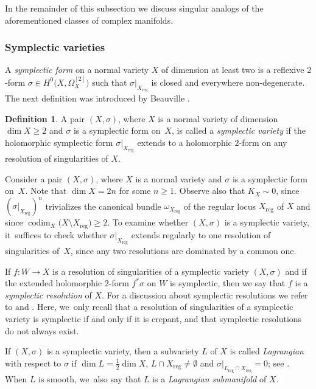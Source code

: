 \documentclass[JEP,XML,SOM,Unicode,published]{cedram}
\theoremstyle{plain}
\theoremstyle{definition}
\newtheorem{dfn}[thm]{Definition}
\DeclareMathOperator{\codim}{codim}
\begin{document}
In the remainder of this subsection we discuss singular analogs of the aforementioned classes of complex manifolds.

\subsubsection{Symplectic varieties}

A \emph{symplectic form} on a normal variety $X$ of dimension at least two is a reflexive $2$-form $\sigma \in H^0 \bigl(X, \Omega_X^{[2]} \bigr)$ such that $\sigma |_{X_\text{reg}}$ is closed and everywhere non-degenerate.
The next definition was introduced by Beauville \cite{Beauville00a}.

\begin{dfn}
\label{dfn:symplectic_variety}
A pair $(X,\sigma)$, where $X$ is a normal variety of dimension $\dim X \geq 2$ and $\sigma$ is a symplectic form on~$X$, is called a \emph{symplectic variety} if the holomorphic symplectic form $\sigma |_{X_\text{reg}}$ extends to a holomorphic $2$-form on any resolution of singularities of $X$.
\end{dfn}

Consider a pair $(X,\sigma)$, where $X$ is a normal variety and $\sigma$ is a symplectic form on~$X$. Note that $\dim X = 2n$ for some $n \geq 1$. Observe also that $K_X \sim 0$, since $(\sigma |_{X_\text{reg}})^n$ trivializes the canonical bundle $\omega_{X_\text{reg}}$ of the regular locus $X_\text{reg}$ of $X$ and since $\codim_X \bigl(X \setminus X_\text{reg} \bigr) \geq 2$.
To examine whether $(X,\sigma)$ is a symplectic variety, it~suffices to check whether $\sigma |_{X_\text{reg}}$ extends regularly to one resolution of singularities of~$X$, since any two resolutions are dominated by a common one.

If $f \colon W \to X$ is a resolution of singularities of a symplectic variety $(X,\sigma)$ and if the extended holomorphic $2$-form $f^* \sigma$ on $W$ is symplectic, then we say that $f$ is a \emph{symplectic resolution} of $X$. For a discussion about symplectic resolutions we refer to \cite{Fu06} and \cite[Rem.\,3.3(2) and Example 3.4(5)]{BL21}. Here, we~only recall that a resolution of singularities of a symplectic variety is symplectic if and only if it is crepant, and that symplectic resolutions do not always exist.

If $(X,\sigma)$ is a symplectic variety, then a subvariety $L$ of $X$ is called \emph{Lagrangian} with respect to $\sigma$ if $\dim L = \frac{1}{2} \dim X$, $L \cap X_{\text{reg}} \neq \emptyset$ and $\sigma |_{L_\text{reg} \cap X_{\text{reg}}} = 0$; see \cite[Lem.\,15]{Schwald20}. When $L$ is smooth, we~also say that $L$ is a \emph{Lagrangian submanifold} of $X$.
\end{document}
